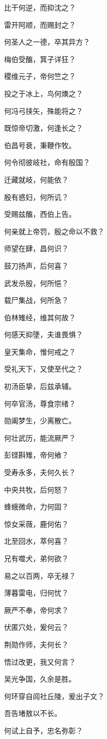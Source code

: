 \documentclass[12pt,a4paper]{ctexbook}
\begin{document}
比干何逆，而抑沈之？\par
雷开阿顺，而赐封之？\par
何圣人之一德，卒其异方？\par
梅伯受醢，箕子详狂？\par
稷维元子，帝何竺之？\par
投之于冰上，鸟何燠之？\par
何冯弓挟矢，殊能将之？\par
既惊帝切激，何逢长之？\par
伯昌号衰，秉鞭作牧。\par
何令彻彼岐社，命有殷国？\par
迁藏就岐，何能依？\par
殷有惑妇，何所讥？\par
受赐兹醢，西伯上告。\par
何亲就上帝罚，殷之命以不救？\par
师望在肆，昌何识？\par
鼓刀扬声，后何喜？\par
武发杀殷，何所悒？\par
载尸集战，何所急？\par
伯林雉经，维其何故？\par
何感天抑墬，夫谁畏惧？\par
皇天集命，惟何戒之？\par
受礼天下，又使至代之？\par
初汤臣挚，后兹承辅。\par
何卒官汤，尊食宗绪？\par
勋阖梦生，少离散亡。\par
何壮武历，能流厥严？\par
彭铿斟雉，帝何飨？\par
受寿永多，夫何久长？\par
中央共牧，后何怒？\par
蜂蛾微命，力何固？\par
惊女采薇，鹿何佑？\par
北至回水，萃何喜？\par
兄有噬犬，弟何欲？\par
易之以百两，卒无禄？\par
薄暮雷电，归何忧？\par
厥严不奉，帝何求？\par
伏匿穴处，爰何云？\par
荆勋作师，夫何长？\par
悟过改更，我又何言？\par
吴光争国，久余是胜。\par
何环穿自闾社丘陵，爰出子文？\par
吾告堵敖以不长。\par
何试上自予，忠名弥彰？\par
\end{document}
